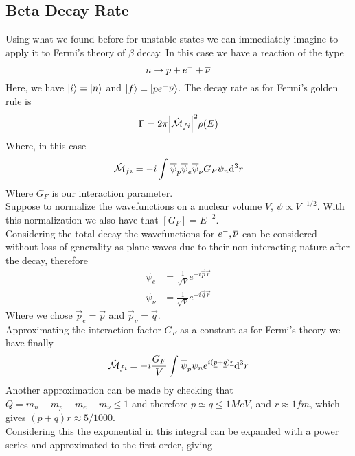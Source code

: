 \documentclass[../qm.tex]{subfiles}
\begin{document}
\subsection{Beta Decay Rate}
Using what we found before for unstable states we can immediately imagine to apply it to Fermi's theory of $\beta$ decay. In this case we have a reaction of the type
\begin{equation*}
	n\to p+e^-+\overline{\nu}
\end{equation*}
Here, we have $\ket{i}=\ket{n}$ and $\ket{f}=\ket{pe^-\overline{\nu}}$. The decay rate as for Fermi's golden rule is
\begin{equation*}
	\Gamma=2\pi\abs{\hat{\mathcal{M}}_{fi}}^2\rho(E)
\end{equation*}
Where, in this case
\begin{equation}
	\hat{\mathcal{M}}_{fi}=-i\int_{}^{}\overline{\psi}_p\overline{\psi}_e\overline{\psi}_\nu G_F\psi_n\dd^3r
	\label{eq:fermidecay}
\end{equation}
Where $G_F$ is our interaction parameter.\\
Suppose to normalize the wavefunctions on a nuclear volume $V$, $\psi\propto V^{-1/2}$. With this normalization we also have that $[G_F]=E^{-2}$.\\
Considering the total decay the wavefunctions for $e^-,\overline{\nu}$ can be considered without loss of generality as plane waves due to their non-interacting nature after the decay, therefore
\begin{equation}
	\begin{aligned}
		\psi_e&=\frac{1}{\sqrt{V}}e^{-i\vec{p}\vec{r}}\\
		\psi_\nu&=\frac{1}{\sqrt{V}}e^{-i\vec{q}\vec{r}}
	\end{aligned}
	\label{eq:electronneutrinowf}
\end{equation}
Where we chose $\vec{p}_e=\vec{p}$ and $\vec{p}_\nu=\vec{q}$.\\
Approximating the interaction factor $G_F$ as a constant as for Fermi's theory we have finally
\begin{equation*}
	\hat{\mathcal{M}}_{fi}=-i\frac{G_F}{V}\int_{}^{}\overline{\psi}_p\psi_ne^{i(\underline{p}+\underline{q})\underline{r}}\dd^3r
\end{equation*}
Another approximation can be made by checking that $Q=m_n-m_p-m_e-m_\nu\le1$ and therefore $p\simeq q\le1\unit{MeV}$, and $r\approx1\unit{fm}$, which gives $(p+q)r\approx5/1000$.\\
Considering this the exponential in this integral can be expanded with a power series and approximated to the first order, giving
\end{document}
